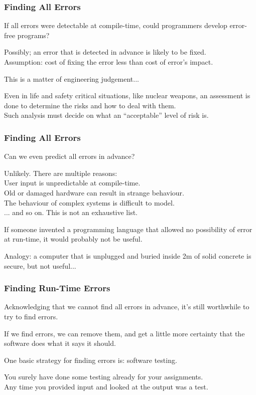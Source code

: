 \begin{frame}
\frametitle{Finding All Errors}
If all errors were detectable at compile-time, could programmers develop error-free programs?

Possibly; an error that is detected in advance is likely to be fixed.\\
\quad Assumption: cost of fixing the error less than cost of error's impact.


This is a matter of engineering judgement...

Even in life and safety critical situations, like nuclear weapons, an assessment is done to determine the risks and how to deal with them.\\
\quad Such analysis must decide on what an ``acceptable'' level of risk is.

\end{frame}

\begin{frame}
\frametitle{Finding All Errors}
Can we even predict all errors in advance?

Unlikely. There are multiple reasons:\\
\quad User input is unpredictable at compile-time.\\
\quad Old or damaged hardware can result in strange behaviour.\\
\quad The behaviour of complex systems is difficult to model.\\
\quad ... and so on. This is not an exhaustive list.

If someone invented a programming language that allowed no possibility of error at run-time, it would probably not be useful.

Analogy: a computer that is unplugged and buried inside 2m of solid concrete is secure, but not useful...

\end{frame}

\begin{frame}
\frametitle{Finding Run-Time Errors}
Acknowledging that we cannot find all errors in advance, it's still worthwhile to try to find errors.

If we find errors, we can remove them, and get a little more certainty that the software does what it says it should.

One basic strategy for finding errors is: \alert{software testing}.

You surely have done some testing already for your assignments.\\
\quad Any time you provided input and looked at the output was a test.

\end{frame}

